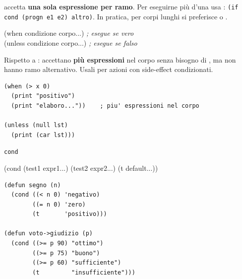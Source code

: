 \begin{nota}
 accetta \textbf{una sola espressione per ramo}.
Per eseguirne più d'una usa :
\texttt{(if cond (progn e1 e2) altro)}.
In pratica, per corpi lunghi si preferisce  o .
\end{nota}

\seprule


\begin{sintassi}
(when   condizione corpo...)  \textit{; esegue se vero}\\
(unless condizione corpo...)  \textit{; esegue se falso}
\end{sintassi}

\begin{confronto}
Rispetto a : accettano \textbf{più espressioni} nel corpo
senza bisogno di , ma non hanno ramo alternativo.
Usali per azioni con side-effect condizionati.
\end{confronto}

\begin{esempio}
\begin{lstlisting}
(when (> x 0)
  (print "positivo")
  (print "elaboro..."))    ; piu' espressioni nel corpo

(unless (null lst)
  (print (car lst)))
\end{lstlisting}
\end{esempio}

\seprule


\begin{concetto}{\texttt{cond}}

\begin{sintassi}
(cond (test1 expr1...)
      (test2 expr2...)
      (t     default...))
\end{sintassi}

\end{concetto}

\begin{esempio}
\begin{lstlisting}
(defun segno (n)
  (cond ((< n 0) 'negativo)
        ((= n 0) 'zero)
        (t       'positivo)))

(defun voto->giudizio (p)
  (cond ((>= p 90) "ottimo")
        ((>= p 75) "buono")
        ((>= p 60) "sufficiente")
        (t         "insufficiente")))
\end{lstlisting}
\end{esempio}

